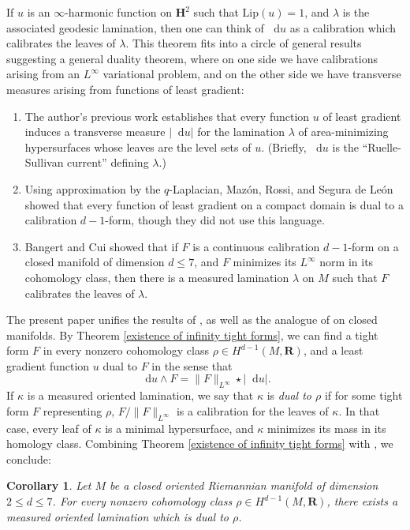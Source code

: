 \documentclass[reqno,11pt]{amsart}
\newcommand{\RR}{\mathbf{R}}
\newcommand{\Hyp}{\mathbf H}
\newcommand*\dif{\mathop{}\!\mathrm{d}}
\newcommand{\Lip}{\mathrm{Lip}}
\newcommand{\dfn}[1]{\emph{#1}\index{#1}}
\newtheorem{corollary}[theorem]{Corollary}
\theoremstyle{definition}
\numberwithin{equation}{section}
\begin{document}
If $u$ is an $\infty$-harmonic function on $\Hyp^2$ such that $\Lip(u) = 1$, and $\lambda$ is the associated geodesic lamination, then one can think of $\dif u$ as a calibration which calibrates the leaves of $\lambda$.
This theorem fits into a circle of general results suggesting a general duality theorem, where on one side we have calibrations arising from an $L^\infty$ variational problem, and on the other side we have transverse measures arising from functions of least gradient:
\begin{enumerate}
\item The author's previous work \cite{BackusCML} establishes that every function $u$ of least gradient induces a transverse measure $|\dif u|$ for the lamination $\lambda$ of area-minimizing hypersurfaces whose leaves are the level sets of $u$.
(Briefly, $\dif u$ is the ``Ruelle-Sullivan current'' defining $\lambda$.)
\item Using approximation by the $q$-Laplacian, Maz\'on, Rossi, and Segura de Le\'on \cite{Mazon14} showed that every function of least gradient on a compact domain is dual to a calibration $d - 1$-form, though they did not use this language.
\item Bangert and Cui \cite{bangert_cui_2017} showed that if $F$ is a continuous calibration $d - 1$-form on a closed manifold of dimension $d \leq 7$, and $F$ minimizes its $L^\infty$ norm in its cohomology class, then there is a measured lamination $\lambda$ on $M$ such that $F$ calibrates the leaves of $\lambda$.
\end{enumerate}

The present paper unifies the results of \cite{daskalopoulos2020transverse,bangert_cui_2017}, as well as the analogue of \cite{Mazon14} on closed manifolds.
By Theorem \ref{existence of infinity tight forms}, we can find a tight form $F$ in every nonzero cohomology class $\rho \in H^{d - 1}(M, \RR)$, and a least gradient function $u$ dual to $F$ in the sense that 
$$\dif u \wedge F = \|F\|_{L^\infty} \star |\dif u|.$$
If $\kappa$ is a measured oriented lamination, we say that $\kappa$ is \dfn{dual to $\rho$} if for some tight form $F$ representing $\rho$, $F/\|F\|_{L^\infty}$ is a calibration for the leaves of $\kappa$.
In that case, every leaf of $\kappa$ is a minimal hypersurface, and $\kappa$ minimizes its mass in its homology class.
Combining Theorem \ref{existence of infinity tight forms} with \cite[Theorem B]{BackusCML}, we conclude:

\begin{corollary}\label{existence of dual laminations}
Let $M$ be a closed oriented Riemannian manifold of dimension $2 \leq d \leq 7$.
For every nonzero cohomology class $\rho \in H^{d - 1}(M, \RR)$, there exists a measured oriented lamination which is dual to $\rho$.
\end{corollary}
\end{document}
